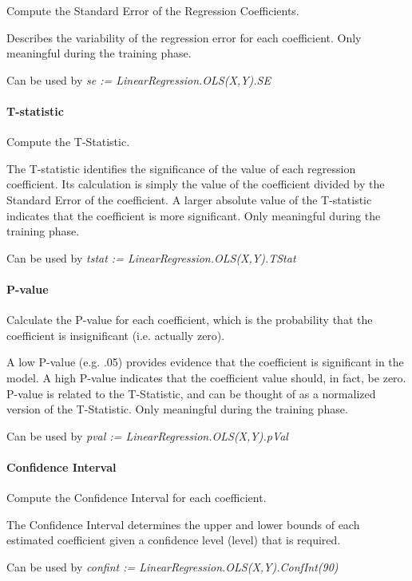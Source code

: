 Compute the Standard Error of the Regression Coefficients. 

Describes the variability of the regression error for each coefficient. Only meaningful during the training phase.

Can be used by \textit{se := LinearRegression.OLS(X,Y).SE}

\paragraph{T-statistic}

Compute the T-Statistic.

The T-statistic identifies the significance of the value of each regression coefficient. Its calculation is simply the value of the coefficient divided by the Standard Error of the coefficient. A larger absolute value of the T-statistic indicates that the coefficient is more significant. Only meaningful during the training phase.

Can be used by \textit{tstat := LinearRegression.OLS(X,Y).TStat}

\paragraph{P-value}

Calculate the P-value for each coefficient, which is the probability that the coefficient is insignificant (i.e. actually zero).

A low P-value (e.g. .05) provides evidence that the coefficient is significant in the model. A high P-value indicates that the coefficient value should, in fact, be zero. P-value is related to the T-Statistic, and can be thought of as a normalized version of the T-Statistic. Only meaningful during the training phase.

Can be used by \textit{pval := LinearRegression.OLS(X,Y).pVal}

\paragraph{Confidence Interval}

Compute the Confidence Interval for each coefficient.

The Confidence Interval determines the upper and lower bounds of each estimated coefficient given a confidence level (level) that is required.

Can be used by \textit{confint := LinearRegression.OLS(X,Y).ConfInt(90)}

